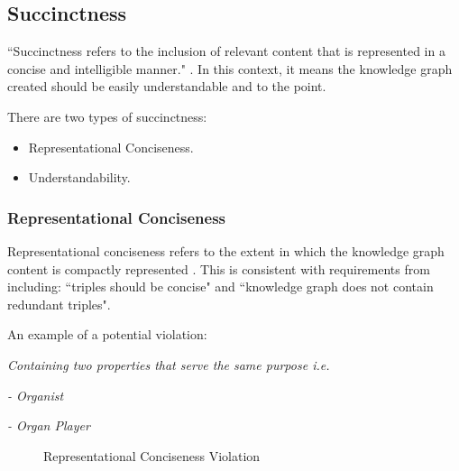 \subsection{Succinctness}
\hspace{0.5cm} ``Succinctness refers to the inclusion of relevant content that is represented in a concise and intelligible manner." \cite{knowledgegraphevaulationbook}. In this context, it means the knowledge graph created should be easily understandable and to the point. 

\noindent There are two types of succinctness: 

\vspace{-0.15cm}
\begin{itemize}
    \itemsep0em 
\item Representational Conciseness.
\vspace{-0.1cm}
\item Understandability.
\end{itemize}
\vspace{-0.4cm}

\subsubsection{Representational Conciseness}
\hspace{0.5cm} Representational conciseness refers to the extent in which the knowledge graph content is compactly represented \cite{knowledgegraphevaulationbook}. This is consistent with requirements from \cite{evaluationpaper} including: ``triples should be concise" and ``knowledge graph does not contain redundant triples".

\noindent An example of a potential violation: 
\vspace{-0.1cm}
\begin{displayquote}
    \textit{Containing two properties that serve the same purpose i.e.}
\end{displayquote}
\vspace{-0.5cm}
\begin{displayquote}
    \textit{- Organist}
\end{displayquote}
\vspace{-0.6cm}
\begin{displayquote}
    \textit{- Organ Player}
\end{displayquote}

\begin{figure}[H]
\begin{center}
\end{center}
\vspace{-0.5cm}
\caption{Representational Conciseness Violation}
\end{figure}

